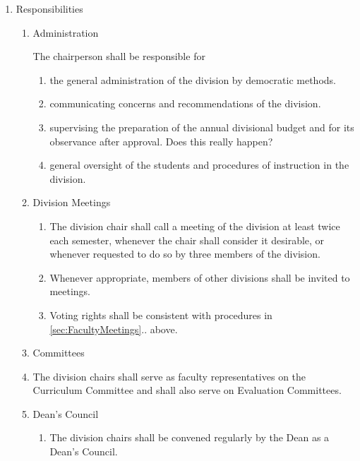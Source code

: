 \documentclass{manual}
\newcommand{\itemLevelA}{\alph*.}
\newcommand{\itemLevelB}{\arabic*)}
\newcommand{\itemLevelC}{\alph*)}
\newcommand{\itemRefA}{\alph*}
\newcommand{\itemRefB}{\arabic*}
\newcommand{\itemRefC}{\alph*}
\begin{document}
\begin{enumerate}[label=\itemLevelA,ref=\itemRefA]
\item \label{item:responsibilities01} Responsibilities
\begin{enumerate}[label=\itemLevelB,ref=\itemRefB]
\item Administration

The chairperson shall be responsible for
\begin{enumerate}[label=\itemLevelC,ref=\itemRefC]
\item the general administration of the division by democratic methods.
\item communicating concerns and recommendations of the division.
\item supervising the preparation of the annual divisional budget and for its observance after approval. Does this really happen?
\item general oversight of the students and procedures of instruction in the division.
\end{enumerate}

\item Division Meetings
\begin{enumerate}[label=\itemLevelC,ref=\itemRefC]
\item The division chair shall call a meeting of the division at least twice each semester, whenever the chair shall consider it desirable, or whenever requested to do so by three members of the division.
\item Whenever appropriate, members of other divisions shall be invited to meetings.
\item Voting rights shall be consistent with procedures in \cref{sec:FacultyMeetings}.. above.
\end{enumerate}

\item Committees
\item The division chairs shall serve as faculty representatives on the Curriculum Committee and shall also serve on Evaluation Committees. 

\item \label{iitem:deansCouncil02} Dean's Council
\begin{enumerate}[label=\itemLevelC,ref=\itemRefC]
\item The division chairs shall be convened regularly by the Dean as a Dean's Council.


\end{enumerate}
\end{enumerate}
\end{enumerate}
\end{document}
